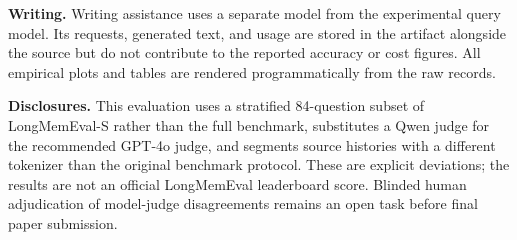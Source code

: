 \textbf{Writing.} Writing assistance uses a separate model from the experimental
query model. Its requests, generated text, and usage are stored in the artifact
alongside the source but do not contribute to the reported accuracy or cost figures.
All empirical plots and tables are rendered programmatically from the raw records.

\textbf{Disclosures.} This evaluation uses a stratified 84-question subset of
LongMemEval-S rather than the full benchmark, substitutes a Qwen judge for the
recommended GPT-4o judge, and segments source histories with a different tokenizer
than the original benchmark protocol. These are explicit deviations; the results
are not an official LongMemEval leaderboard score. Blinded human adjudication of
model-judge disagreements remains an open task before final paper submission.
